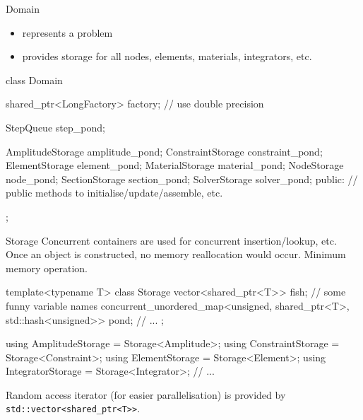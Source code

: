 \documentclass[fleqn,10pt]{beamer}
\begin{document}
\begin{frame}[containsverbatim]{Domain}
\begin{itemize}
\item represents a problem
\item provides storage for all nodes, elements, materials, integrators, etc.
\end{itemize}
\begin{cppcode}
class Domain {
    shared_ptr<LongFactory> factory; // use double precision

    StepQueue step_pond;

    AmplitudeStorage amplitude_pond;
    ConstraintStorage constraint_pond;
    ElementStorage element_pond;
    MaterialStorage material_pond;
    NodeStorage node_pond;
    SectionStorage section_pond;
    SolverStorage solver_pond;
public:
    // public methods to initialise/update/assemble, etc.
};
\end{cppcode}
\end{frame}
\begin{frame}[containsverbatim]{Storage}
Concurrent containers are used for concurrent insertion/lookup, etc.
Once an object is constructed, no memory reallocation would occur.
Minimum memory operation.
\begin{cppcode}[highlightlines={3}]
template<typename T> class Storage {
    vector<shared_ptr<T>> fish; // some funny variable names
    concurrent_unordered_map<unsigned, shared_ptr<T>, std::hash<unsigned>> pond;
    // ...
};

using AmplitudeStorage = Storage<Amplitude>;
using ConstraintStorage = Storage<Constraint>;
using ElementStorage = Storage<Element>;
using IntegratorStorage = Storage<Integrator>;
// ...
\end{cppcode}
Random access iterator (for easier parallelisation) is provided by \texttt{std::vector<shared\_ptr<T>>}.
\end{frame}
\end{document}
